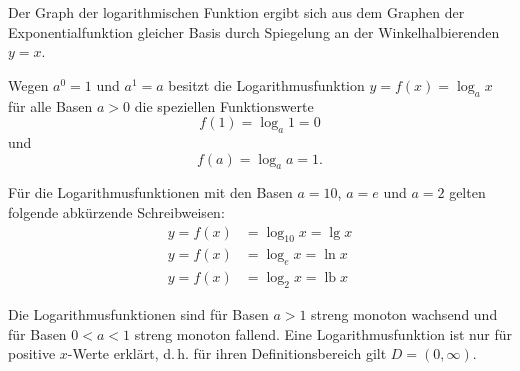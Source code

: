 \begin{center}
\end{center}

Der Graph der logarithmischen Funktion ergibt sich aus dem Graphen der Exponentialfunktion gleicher Basis durch Spiegelung an der Winkelhalbierenden $y = x$.

Wegen $a^0 = 1$ und $a^1 = a$ besitzt die Logarithmusfunktion $y = f(x) = \log_a x$ für alle Basen $a > 0$ die speziellen Funktionswerte
\[ f(1) = \log_a 1 = 0 \]
und
\[ f(a) = \log_a a = 1 . \]

Für die Logarithmusfunktionen mit den Basen $a = 10$, $a = e$ und $a = 2$ gelten folgende abkürzende Schreibweisen:
\begin{align*}
  y = f(x) &= \log_{10} x = \lg x\\
  y = f(x) &= \log_e x = \ln x\\
  y = f(x) &= \log_2 x = \operatorname{lb} x
\end{align*}

\begin{center}
\end{center}

Die Logarithmusfunktionen sind für Basen $a > 1$ streng monoton wachsend und für Basen $0 < a < 1$ streng monoton fallend. Eine Logarithmusfunktion ist nur für positive $x$-Werte erklärt, d.\,h. für ihren Definitionsbereich gilt $D = (0, \infty)$.

